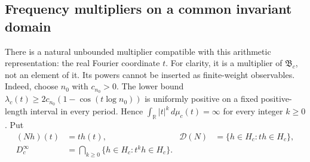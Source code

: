 \documentclass[11pt]{article}
\theoremstyle{definition}
\theoremstyle{remark}
\numberwithin{equation}{section}
\newcommand{\R}{\mathbb R}
\begin{document}
\subsection{Frequency multipliers on a common invariant domain}

There is a natural unbounded multiplier compatible with this arithmetic
representation: the real Fourier coordinate $t$.
For clarity, it is a multiplier of $\mathfrak B_c$, not an element of it.
Its powers cannot be inserted as finite-weight observables.
Indeed, choose $n_0$ with $c_{n_0}>0$.
The lower bound
$\lambda_c(t)\geq2c_{n_0}(1-\cos(t\log n_0))$
is uniformly positive on a fixed positive-length interval in every
period.  Hence $\int_\R |t|^k\,d\mu_c(t)=\infty$
for every integer $k\geq0$.
Put
\begin{equation}
 \begin{aligned}
 (Nh)(t)&=t h(t),&
 \mathcal D(N)&=\{h\in H_c:t h\in H_c\},\\
 D_c^\infty&=\bigcap_{k\geq0}\{h\in H_c:t^k h\in H_c\}.&&
 \end{aligned}
 \label{eq:wp-moment-domain}
\end{equation}
\end{document}
